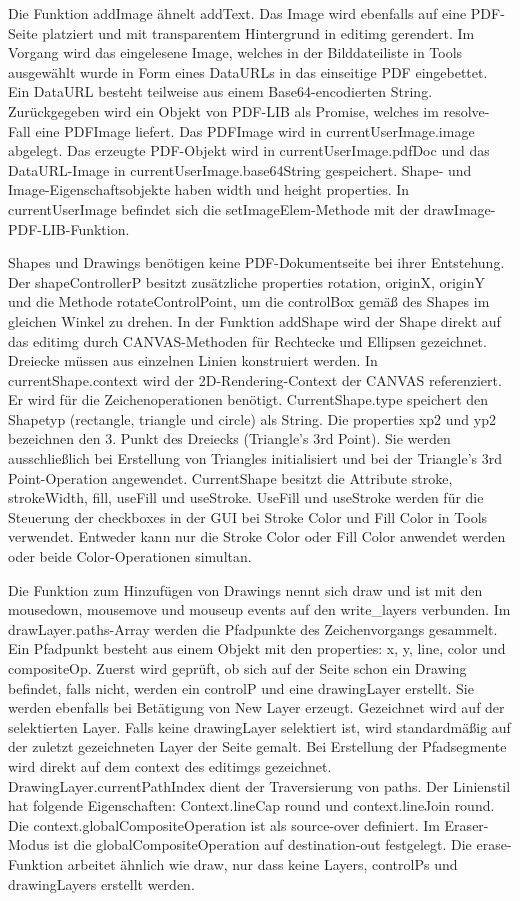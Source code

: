 Die Funktion addImage ähnelt addText. Das Image wird ebenfalls auf eine PDF-Seite platziert und mit transparentem Hintergrund in editimg gerendert. Im Vorgang wird das eingelesene Image, welches in der Bilddateiliste in Tools ausgewählt wurde in Form eines DataURLs in das einseitige PDF eingebettet. Ein DataURL besteht teilweise aus einem Base64-encodierten String. Zurückgegeben wird ein Objekt von PDF-LIB als Promise, welches im resolve-Fall eine PDFImage liefert. Das PDFImage wird in currentUserImage.image abgelegt. Das erzeugte PDF-Objekt wird in currentUserImage.pdfDoc und das DataURL-Image in currentUserImage.base64String gespeichert. Shape- und Image-Eigenschaftsobjekte haben width und height properties. In currentUserImage befindet sich die setImageElem-Methode mit der drawImage-PDF-LIB-Funktion.
\par
Shapes und Drawings benötigen keine PDF-Dokumentseite bei ihrer Entstehung. Der shapeControllerP besitzt zusätzliche properties rotation, originX, originY und die Methode rotateControlPoint, um die controlBox gemäß des Shapes im gleichen Winkel zu drehen. In der Funktion addShape wird der Shape direkt auf das editimg durch CANVAS-Methoden für Rechtecke und Ellipsen gezeichnet. Dreiecke müssen aus einzelnen Linien konstruiert werden. In currentShape.context wird der 2D-Rendering-Context der CANVAS referenziert. Er wird für die Zeichenoperationen benötigt. CurrentShape.type speichert den Shapetyp (rectangle, triangle und circle) als String. Die properties xp2 und yp2 bezeichnen den 3. Punkt des Dreiecks (Triangle's 3rd Point). Sie werden ausschließlich bei Erstellung von Triangles initialisiert und bei der Triangle's 3rd Point-Operation angewendet. CurrentShape besitzt die Attribute stroke, strokeWidth, fill, useFill und useStroke. UseFill und useStroke werden für die Steuerung der checkboxes in der GUI bei Stroke Color und Fill Color in Tools verwendet. Entweder kann nur die Stroke Color oder Fill Color anwendet werden oder beide Color-Operationen simultan. 
\par 
Die Funktion zum Hinzufügen von Drawings nennt sich draw und ist mit den mousedown, mousemove und mouseup events auf den write\_layers verbunden. Im drawLayer.paths-Array werden die Pfadpunkte des Zeichenvorgangs gesammelt. Ein Pfadpunkt besteht aus einem Objekt mit den properties:  x, y, line, color und compositeOp. Zuerst wird geprüft, ob sich auf der Seite schon ein Drawing befindet, falls nicht, werden ein controlP und eine drawingLayer erstellt. Sie werden ebenfalls bei Betätigung von New Layer erzeugt. Gezeichnet wird auf der selektierten Layer. Falls keine drawingLayer selektiert ist, wird standardmäßig auf der zuletzt gezeichneten Layer der Seite gemalt. Bei Erstellung der Pfadsegmente wird direkt auf dem context des editimgs gezeichnet. DrawingLayer.currentPathIndex dient der Traversierung von paths. Der Linienstil hat folgende Eigenschaften: Context.lineCap round und context.lineJoin round. Die context.globalCompositeOperation ist als source-over definiert. Im Eraser-Modus ist die globalCompositeOperation auf destination-out festgelegt. Die erase-Funktion arbeitet ähnlich wie draw, nur dass keine Layers, controlPs und drawingLayers erstellt werden. 


